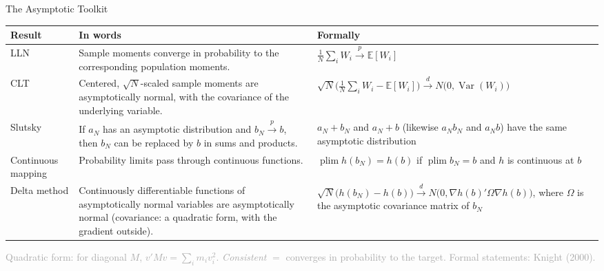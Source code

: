 \documentclass[aspectratio=169,11pt]{beamer}
\newcommand{\E}{\mathbb{E}}
\newcommand{\Var}{\operatorname{Var}}
\DeclareMathOperator*{\plim}{plim}
\newcommand{\pto}{\xrightarrow{\;p\;}}
\newcommand{\dto}{\xrightarrow{\;d\;}}
\newcommand{\Src}[1]{{\scriptsize\textcolor{DarkGray}{#1}}}
\begin{document}
\begin{frame}{The Asymptotic Toolkit}
\small

{\footnotesize
\renewcommand{\arraystretch}{1.15}
\noindent
\begin{tabular}{@{}B{1.8cm}L{6.3cm}L{6.1cm}@{}}
\toprule
Result & In words & Formally \\
\midrule
LLN
  & Sample moments converge in probability to the corresponding population
    moments.
  & $\frac1N\sum_iW_i\pto\E[W_i]$ \\
CLT
  & Centered, $\sqrt N$-scaled sample moments are asymptotically normal,
    with the covariance of the underlying variable.
  & $\sqrt N\big(\frac1N\sum_iW_i-\E[W_i]\big)\dto N\big(0,\Var(W_i)\big)$ \\
Slutsky
  & If $a_N$ has an asymptotic distribution and $b_N\pto b$, then $b_N$ can
    be replaced by $b$ in sums and products.
  & $a_N+b_N$ and $a_N+b$ (likewise $a_Nb_N$ and $a_Nb$) have the same
    asymptotic distribution \\
Continuous mapping
  & Probability limits pass through continuous functions.
  & $\plim h(b_N)=h(b)$ if $\plim b_N=b$ and $h$ is continuous at $b$ \\
Delta method
  & Continuously differentiable functions of asymptotically normal
    variables are asymptotically normal (covariance: a quadratic form, with
    the gradient outside).
  & $\sqrt N\big(h(b_N)-h(b)\big)\dto N\big(0,\nabla h(b)'\Omega\nabla h(b)\big)$,
    where $\Omega$ is the asymptotic covariance matrix of $b_N$ \\
\bottomrule
\end{tabular}
\par}

\smallskip

\Src{Quadratic form: for diagonal $M$, $v'Mv=\sum_i m_iv_i^2$.\quad
\emph{Consistent} $=$ converges in probability to the target.\quad
Formal statements: Knight (2000).}

\end{frame}
\end{document}
